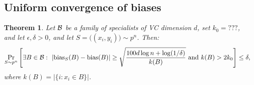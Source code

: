 \documentclass{article}
\newtheorem{theorem}{Theorem}[section]
\newcommand{\B}{{\cal B}}
\newcommand{\bias}{\text{bias}}
\newcommand{\samp}{S}
\newcommand{\eps}{\epsilon}
\begin{document}
\subsection{Uniform convergence of biases}
\begin{theorem}
Let $\B$ be a family of specialists of VC dimension $d$, 
set $k_0 = ???$, and
let $\eps,\delta>0$,
and let $S=\bigl((x_i,y_i)\bigr) \sim p^n$.
Then:
\[\Pr_{\samp\sim p^n}\left[\exists {B\in\B}:~\lvert
  \bias_{\samp}(B) -  \bias(B)\rvert \geq \sqrt{\frac{100d\log n +
      \log(1/\delta)}{k(B)} }
  \mbox{ and } k(B)>2k_0
  \right] \leq \delta,
\]
where $k(B) = \lvert\{ i : x_i\in B \}\rvert$.
\end{theorem}
\end{document}
